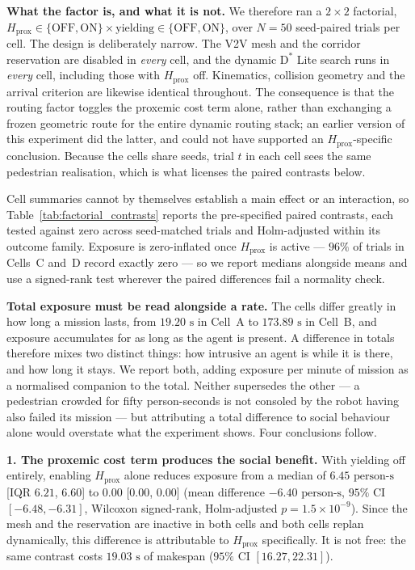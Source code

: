 \documentclass[journal]{IEEEtran}
\begin{document}
\textbf{What the factor is, and what it is not.} We therefore ran a $2\times2$ factorial, $H_{\text{prox}} \in \{\text{OFF}, \text{ON}\} \times \text{yielding} \in \{\text{OFF}, \text{ON}\}$, over $N=50$ seed-paired trials per cell. The design is deliberately narrow. The V2V mesh and the corridor reservation are disabled in \emph{every} cell, and the dynamic $\text{D}^*$ Lite search runs in \emph{every} cell, including those with $H_{\text{prox}}$ off. Kinematics, collision geometry and the arrival criterion are likewise identical throughout. The consequence is that the routing factor toggles the proxemic cost term alone, rather than exchanging a frozen geometric route for the entire dynamic routing stack; an earlier version of this experiment did the latter, and could not have supported an $H_{\text{prox}}$-specific conclusion. Because the cells share seeds, trial $t$ in each cell sees the same pedestrian realisation, which is what licenses the paired contrasts below.




Cell summaries cannot by themselves establish a main effect or an interaction, so Table~\ref{tab:factorial_contrasts} reports the pre-specified paired contrasts, each tested against zero across seed-matched trials and Holm-adjusted within its outcome family. Exposure is zero-inflated once $H_{\text{prox}}$ is active --- $96\%$ of trials in Cells~C and~D record exactly zero --- so we report medians alongside means and use a signed-rank test wherever the paired differences fail a normality check.

\textbf{Total exposure must be read alongside a rate.} The cells differ greatly in how long a mission lasts, from $19.20\text{ s}$ in Cell~A to $173.89\text{ s}$ in Cell~B, and exposure accumulates for as long as the agent is present. A difference in totals therefore mixes two distinct things: how intrusive an agent is while it is there, and how long it stays. We report both, adding exposure per minute of mission as a normalised companion to the total. Neither supersedes the other --- a pedestrian crowded for fifty person-seconds is not consoled by the robot having also failed its mission --- but attributing a total difference to social behaviour alone would overstate what the experiment shows. Four conclusions follow.

\textbf{1. The proxemic cost term produces the social benefit.} With yielding off entirely, enabling $H_{\text{prox}}$ alone reduces exposure from a median of $6.45\text{ person-s}$ [IQR $6.21$, $6.60$] to $0.00$ [$0.00$, $0.00$] (mean difference $-6.40\text{ person-s}$, $95\%$ CI $[-6.48, -6.31]$, Wilcoxon signed-rank, Holm-adjusted $p = 1.5 \times 10^{-9}$). Since the mesh and the reservation are inactive in both cells and both cells replan dynamically, this difference is attributable to $H_{\text{prox}}$ specifically. It is not free: the same contrast costs $19.03\text{ s}$ of makespan ($95\%$ CI $[16.27, 22.31]$).
\end{document}
